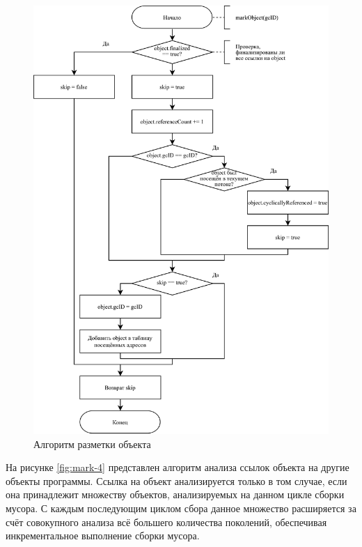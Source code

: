 \begin{figure}[H]
	\centering
	\includegraphics[scale=0.185]{assets/mark-3.png}
	\caption{Алгоритм разметки объекта}
	\label{fig:mark-3}
\end{figure}

На рисунке \ref{fig:mark-4} представлен алгоритм анализа ссылок объекта на другие объекты программы. Ссылка на объект анализируется только в том случае, если она принадлежит множеству объектов, анализируемых на данном цикле сборки мусора. С каждым последующим циклом сбора данное множество расширяется за счёт совокупного анализа всё большего количества поколений, обеспечивая инкрементальное выполнение сборки мусора.

